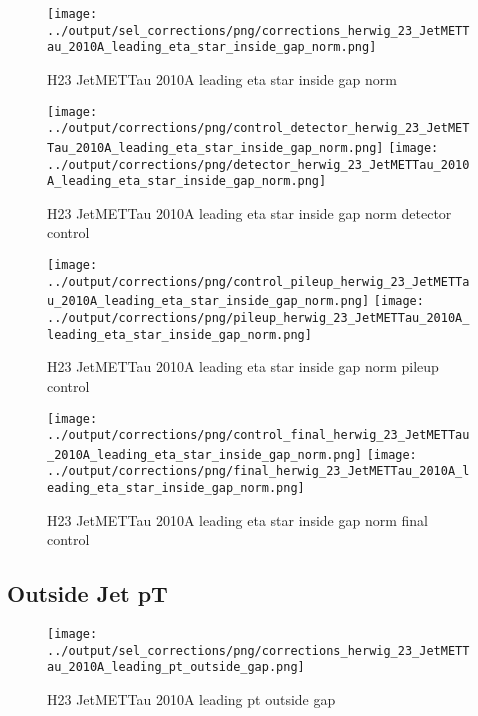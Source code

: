 \documentclass[11pt]{book}
\begin{document}
\begin{figure}[ht]
\centering
\texttt{[image: ../output/sel\_corrections/png/corrections\_herwig\_23\_JetMETTau\_2010A\_leading\_eta\_star\_inside\_gap\_norm.png]}
\caption{H23 JetMETTau 2010A leading eta star inside gap norm}
\label{fig:H23_JetMETTau_2010A_leading_eta_star_inside_gap_norm}
\end{figure}

\begin{figure}[ht]
\centering
\texttt{[image: ../output/corrections/png/control\_detector\_herwig\_23\_JetMETTau\_2010A\_leading\_eta\_star\_inside\_gap\_norm.png]}
\texttt{[image: ../output/corrections/png/detector\_herwig\_23\_JetMETTau\_2010A\_leading\_eta\_star\_inside\_gap\_norm.png]}
\caption{H23 JetMETTau 2010A leading eta star inside gap norm detector control}
\label{fig:H23_JetMETTau_2010A_leading_eta_star_inside_gap_norm_detector_control}
\end{figure}

\begin{figure}[ht]
\centering
\texttt{[image: ../output/corrections/png/control\_pileup\_herwig\_23\_JetMETTau\_2010A\_leading\_eta\_star\_inside\_gap\_norm.png]}
\texttt{[image: ../output/corrections/png/pileup\_herwig\_23\_JetMETTau\_2010A\_leading\_eta\_star\_inside\_gap\_norm.png]}
\caption{H23 JetMETTau 2010A leading eta star inside gap norm pileup control}
\label{fig:H23_JetMETTau_2010A_leading_eta_star_inside_gap_norm_pileup_control}
\end{figure}


\begin{figure}[ht]
\centering
\texttt{[image: ../output/corrections/png/control\_final\_herwig\_23\_JetMETTau\_2010A\_leading\_eta\_star\_inside\_gap\_norm.png]}
\texttt{[image: ../output/corrections/png/final\_herwig\_23\_JetMETTau\_2010A\_leading\_eta\_star\_inside\_gap\_norm.png]}
\caption{H23 JetMETTau 2010A leading eta star inside gap norm final control}
\label{fig:H23_JetMETTau_2010A_leading_eta_star_inside_gap_norm_final_control}
\end{figure}

\clearpage
\subsection{Outside Jet pT}
\begin{figure}[ht]
\centering
\texttt{[image: ../output/sel\_corrections/png/corrections\_herwig\_23\_JetMETTau\_2010A\_leading\_pt\_outside\_gap.png]}
\caption{H23 JetMETTau 2010A leading pt outside gap}
\label{fig:H23_JetMETTau_2010A_leading_pt_outside_gap}
\end{figure}
\end{document}
